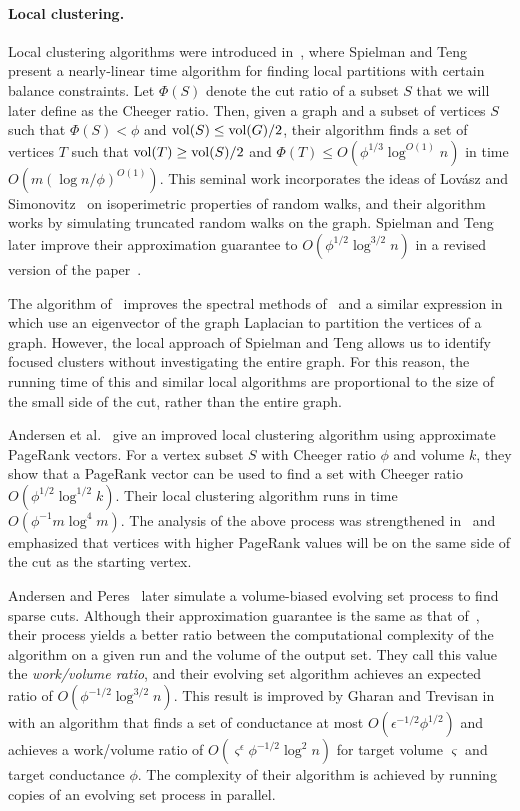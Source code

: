 \documentclass[runningheads,a4paper]{llncs}
\newcommand{\vol}{\textmd{vol}}
\begin{document}
\paragraph{Local clustering.} Local clustering algorithms were introduced
in~\cite{st:graphpartitioning:stoc04}, where Spielman and Teng present a
nearly-linear time algorithm for finding local partitions with certain balance
constraints.  Let $\Phi(S)$ denote the cut ratio of a subset $S$ that we will
later define as the Cheeger ratio.  Then, given a graph and a subset of vertices
$S$ such that $\Phi(S) < \phi$ and $\vol(S)\leq \vol(G)/2$, their algorithm
finds a set of vertices $T$ such that $\vol(T) \geq \vol(S)/2$ and $\Phi(T) \leq
O(\phi^{1/3}\log^{O(1)}n)$ in time $O(m(\log n/\phi)^{O(1)})$.  This seminal
work incorporates the ideas of Lov\'asz and
Simonovitz~\cite{ls:mixingisoperimetric:90,ls:randomwalks:93} on isoperimetric
properties of random walks, and their algorithm works by simulating truncated
random walks on the graph.  Spielman and Teng later improve their approximation
guarantee to $O(\phi^{1/2}\log^{3/2}n)$ in a revised version of the
paper~\cite{st:localcluster:08}.

The algorithm of~\cite{st:graphpartitioning:stoc04,st:localcluster:08} improves
the spectral methods of~\cite{donath1972algorithms} and a similar expression
in~\cite{aloniso85} which use an eigenvector of the graph Laplacian to partition
the vertices of a graph.  However, the local approach of Spielman and Teng
allows us to identify focused clusters without investigating the entire graph.
For this reason, the running time of this and similar local algorithms are
proportional to the size of the small side of the cut, rather than the entire
graph.

Andersen et al.~\cite{acl:prgraphpartition:focs06} give an improved local
clustering algorithm using approximate PageRank vectors.  For a vertex subset
$S$ with Cheeger ratio $\phi$ and volume $k$, they show that a PageRank vector
can be used to find a set with Cheeger ratio $O(\phi^{1/2}\log^{1/2}k)$.  Their
local clustering algorithm runs in time $O(\phi^{-1}m\log^4 m)$.  The analysis
of the above process was strengthened in~\cite{ac:sharpdrops:07} and emphasized
that vertices with higher PageRank values will be on the same side of the cut as
the starting vertex.

Andersen and Peres~\cite{ap:evolving:09} later simulate a volume-biased evolving
set process to find sparse cuts.  Although their approximation guarantee is the
same as that of~\cite{acl:prgraphpartition:focs06}, their process yields a
better ratio between the computational complexity of the algorithm on a given
run and the volume of the output set.  They call this value the
\emph{work/volume ratio}, and their evolving set algorithm achieves an expected
ratio of $O(\phi^{-1/2}\log^{3/2}n)$.  This result is improved by Gharan and
Trevisan in~\cite{gt:optimalcluster:12} with an algorithm that finds a set of
conductance at most $O(\epsilon^{-1/2}\phi^{1/2})$ and achieves a work/volume
ratio of $O(\varsigma^{\epsilon}\phi^{-1/2}\log^2n)$ for target volume
$\varsigma$ and target conductance $\phi$.  The complexity of their algorithm is
achieved by running copies of an evolving set process in parallel.
\end{document}
